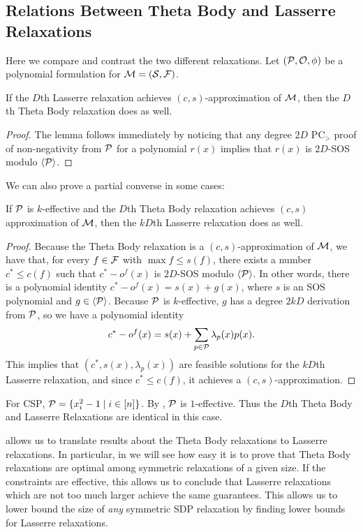 \subsection{Relations Between Theta Body and Lasserre Relaxations}
Here we compare and contrast the two different relaxations. Let $(\mathcal P, \mathcal O, \phi)$ be a polynomial formulation for $\mathcal M = (\mathcal S, \mathcal F)$.
\begin{lemma}
If the $D$th Lasserre relaxation achieves $(c,s)$-approximation of $\mathcal M$, then the $D$th Theta Body relaxation does as well.
\end{lemma}
\begin{proof}
The lemma follows immediately by noticing that any degree $2D$ PC$_>$ proof of non-negativity from $\mathcal P$ for a polynomial $r(x)$ implies that $r(x)$ is $2D$-SOS modulo $\langle \mathcal P \rangle$.
\end{proof}
We can also prove a partial converse in some cases:
\begin{proposition}\label{prop:tb_to_sos}
If $\mathcal P$ is $k$-effective and the $D$th Theta Body relaxation achieves $(c,s)$ approximation of $\mathcal M$, then the $kD$th Lasserre relaxation does as well.
\end{proposition}
\begin{proof}
Because the Theta Body relaxation is a $(c,s)$-approximation of $\mathcal M$, we have that, for every $f \in \mathcal F$ with $\max f \leq s(f)$, there exists a number $c^* \leq c(f)$ such that $c^* - o^f(x)$ is $2D$-SOS modulo $\langle \mathcal P \rangle$. In other words, there is a polynomial identity $c^* - o^f(x) = s(x) + g(x)$, where $s$ is an SOS polynomial and $g \in \langle \mathcal P \rangle$. Because $\mathcal P$ is $k$-effective, $g$ has a degree $2kD$ derivation from $\mathcal P$, so we have a polynomial identity
\[c^* - o^f(x) = s(x) + \sum_{p \in \mathcal P} \lambda_p(x)p(x).\]
This implies that $(c^*, s(x), \lambda_p(x))$ are feasible solutions for the $kD$th Lasserre relaxation, and since $c^* \leq c(f)$, it achieves a $(c,s)$-approximation.
\end{proof}
\begin{example}
For \textsc{CSP}, $\mathcal P = \{x_i^2 - 1 \mid i \in [n]\}$. By , $\mathcal P$ is $1$-effective. Thus the $D$th Theta Body and Lasserre Relaxations are identical in this case.
\end{example}
 allows us to translate results about the Theta Body relaxations to Lasserre relaxations. In particular, in  we will see how easy it is to prove that Theta Body relaxations are optimal among symmetric relaxations of a given size. If the constraints are effective, this allows us to conclude that Lasserre relaxations which are not too much larger achieve the same guarantees. This allows us to lower bound the size of \emph{any} symmetric SDP relaxation by finding lower bounds for Lasserre relaxations.

